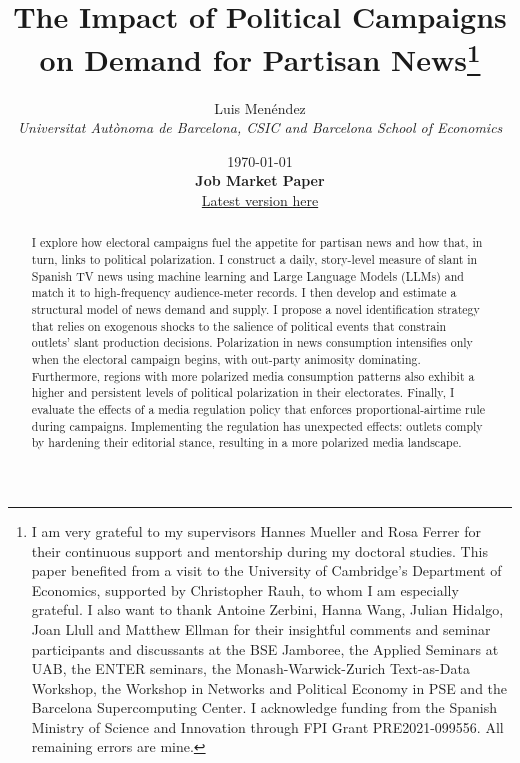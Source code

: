 \documentclass[12pt]{article}
\title{The Impact of Political Campaigns on Demand for Partisan News\thanks{I am very grateful to my supervisors Hannes Mueller and Rosa Ferrer for their continuous support and mentorship during my doctoral studies. This paper benefited from a visit to the University of Cambridge’s Department of Economics, supported by Christopher Rauh, to whom I am especially grateful. I also want to thank Antoine Zerbini,  Hanna Wang, Julian Hidalgo, Joan Llull and Matthew Ellman for their insightful comments and seminar participants and discussants at the BSE Jamboree, the Applied Seminars at UAB, the ENTER seminars, the Monash-Warwick-Zurich Text-as-Data Workshop, the Workshop in Networks and Political Economy in PSE and the Barcelona Supercomputing Center. I acknowledge funding from the Spanish Ministry of Science and Innovation through FPI Grant PRE2021-099556. All remaining errors are mine.}}
\author{Luis  Menéndez \\
	\textit{\small Universitat Autònoma de Barcelona, CSIC and Barcelona School of Economics}
} %
\date{%
	\today\\[0.2ex]
	{\bfseries Job Market Paper}\\[0.2ex]
	{\normalsize\href{https://www.dropbox.com/scl/fi/f3546vufz11vj5r63xml4/elections_draft.pdf?rlkey=exjw9vm3sasahlb54ohjf2tyx\&e=1\&dl=0}{Latest version here}}
}
\renewcommand\thepart{}      %
\renewcommand\partname{}      %
\begin{document}
	
\renewcommand\thepart{}      %
\renewcommand\partname{}      %

	
	\maketitle
	\enlargethispage{2\baselineskip}
	
	
	\vspace{-1cm}
	
	
	\begin{abstract}
		
		
	
	
I explore how electoral campaigns fuel the appetite for partisan news and how that, in turn, links to political polarization. I construct a daily, story-level measure of slant in Spanish TV news using machine learning and Large Language Models (LLMs) and match it to high-frequency audience-meter records. I then develop and estimate a structural model of news demand and supply. I propose a  novel identification strategy that relies on  exogenous shocks to the salience of political events that constrain outlets’  slant production decisions. Polarization in news consumption intensifies only when the electoral campaign begins, with out-party animosity dominating. Furthermore, regions with more polarized media consumption patterns also exhibit a higher and persistent levels of political polarization in their electorates.  Finally, I evaluate the effects of a media regulation policy that enforces proportional-airtime rule during campaigns. Implementing the regulation has unexpected effects: outlets comply by hardening their editorial stance, resulting in a more polarized media landscape.




\end{abstract}
\end{document}
